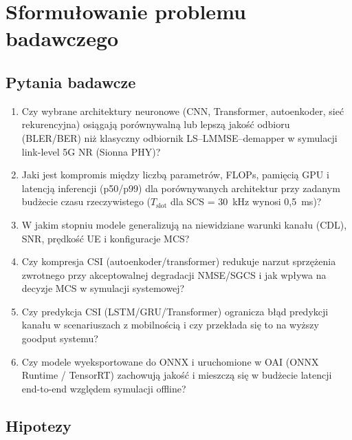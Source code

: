 \documentclass[12pt, a4paper]{article}
\begin{document}
\section{Sformułowanie problemu badawczego}

\subsection{Pytania badawcze}

\begin{enumerate}[label=\textbf{RQ\arabic*:}, leftmargin=*]
    \item Czy wybrane architektury neuronowe (CNN, Transformer, autoenkoder, sieć rekurencyjna) osiągają porównywalną lub lepszą jakość odbioru (BLER/BER) niż klasyczny odbiornik LS--LMMSE--demapper w symulacji link-level 5G NR (Sionna PHY)?
    \item Jaki jest kompromis między liczbą parametrów, FLOPs, pamięcią GPU i latencją inferencji (p50/p99) dla porównywanych architektur przy zadanym budżecie czasu rzeczywistego ($T_{\mathrm{slot}}$ dla SCS = 30~kHz wynosi 0,5~ms)?
    \item W jakim stopniu modele generalizują na niewidziane warunki kanału (CDL), SNR, prędkość UE i konfiguracje MCS?
    \item Czy kompresja CSI (autoenkoder/transformer) redukuje narzut sprzężenia zwrotnego przy akceptowalnej degradacji NMSE/SGCS i jak wpływa na decyzje MCS w symulacji systemowej?
    \item Czy predykcja CSI (LSTM/GRU/Transformer) ogranicza błąd predykcji kanału w scenariuszach z mobilnością i czy przekłada się to na wyższy goodput systemu?
    \item Czy modele wyeksportowane do ONNX i uruchomione w OAI (ONNX Runtime / TensorRT) zachowują jakość i mieszczą się w budżecie latencji end-to-end względem symulacji offline?
\end{enumerate}

\subsection{Hipotezy}
\end{document}
